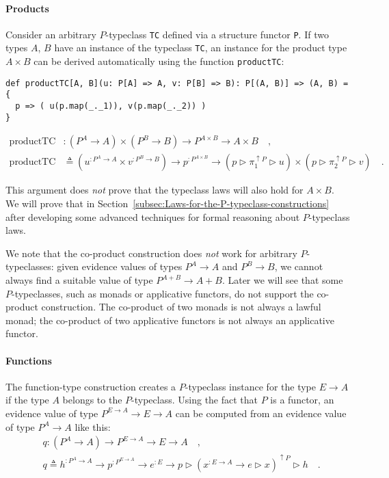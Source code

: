 \paragraph{Products}

Consider an arbitrary $P$-typeclass \lstinline!TC! defined via a
structure functor \lstinline!P!. If two types $A$, $B$ have an
instance of the typeclass \lstinline!TC!, an instance for the product
type $A\times B$ can be derived automatically using the function
\lstinline!productTC!:
\begin{lstlisting}
def productTC[A, B](u: P[A] => A, v: P[B] => B): P[(A, B)] => (A, B) = {
  p => ( u(p.map(_._1)), v(p.map(_._2)) )
}
\end{lstlisting}
\begin{align*}
\text{productTC} & :(P^{A}\rightarrow A)\times(P^{B}\rightarrow B)\rightarrow P^{A\times B}\rightarrow A\times B\quad,\\
\text{productTC} & \triangleq(u^{:P^{A}\rightarrow A}\times v^{:P^{B}\rightarrow B})\rightarrow p^{:P^{A\times B}}\rightarrow(p\triangleright\pi_{1}^{\uparrow P}\triangleright u)\times(p\triangleright\pi_{2}^{\uparrow P}\triangleright v)\quad.
\end{align*}

This argument does \emph{not} prove that the typeclass laws will also
hold for $A\times B$. We will prove that in Section~\ref{subsec:Laws-for-the-P-typeclass-constructions}
after developing some advanced techniques for formal reasoning about
$P$-typeclass laws.

We note that the co-product construction does \emph{not} work for
arbitrary $P$-typeclasses: given evidence values of types $P^{A}\rightarrow A$
and $P^{B}\rightarrow B$, we cannot always find a suitable value
of type $P^{A+B}\rightarrow A+B$. Later we will see that some $P$-typeclasses,
such as monads or applicative functors, do not support the co-product
construction. The co-product of two monads is not always a lawful
monad; the co-product of two applicative functors is not always an
applicative functor.

\paragraph{Functions}

The function-type construction creates a $P$-typeclass instance for
the type $E\rightarrow A$ if the type $A$ belongs to the $P$-typeclass.
Using the fact that $P$ is a functor, an evidence value of type $P^{E\rightarrow A}\rightarrow E\rightarrow A$
can be computed from an evidence value of type $P^{A}\rightarrow A$
like this:
\begin{align*}
 & q:(P^{A}\rightarrow A)\rightarrow P^{E\rightarrow A}\rightarrow E\rightarrow A\quad,\\
 & q\triangleq h^{:P^{A}\rightarrow A}\rightarrow p^{:P^{E\rightarrow A}}\rightarrow e^{:E}\rightarrow p\triangleright(x^{:E\rightarrow A}\rightarrow e\triangleright x)^{\uparrow P}\triangleright h\quad.
\end{align*}

